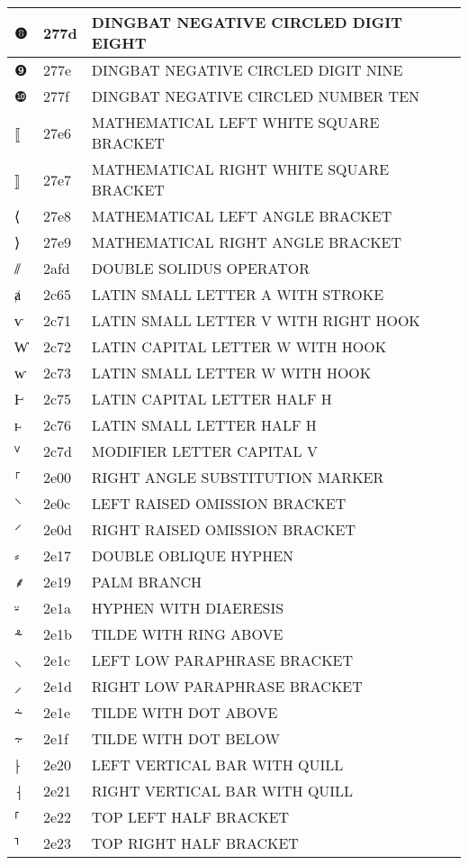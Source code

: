 \documentclass[12pt,letterpaper,openany]{book}
\begin{document}
\begin{center}
\begin{supertabular}{|m{0.25in}|m{0.5in}|m{4in}|}
❽ & 277d & DINGBAT NEGATIVE CIRCLED DIGIT EIGHT\\\hline
❾ & 277e & DINGBAT NEGATIVE CIRCLED DIGIT NINE\\\hline
❿ & 277f & DINGBAT NEGATIVE CIRCLED NUMBER TEN\\\hline
⟦ & 27e6 & MATHEMATICAL LEFT WHITE SQUARE BRACKET\\\hline
⟧ & 27e7 & MATHEMATICAL RIGHT WHITE SQUARE BRACKET\\\hline
⟨ & 27e8 & MATHEMATICAL LEFT ANGLE BRACKET\\\hline
⟩ & 27e9 & MATHEMATICAL RIGHT ANGLE BRACKET\\\hline
⫽ & 2afd & DOUBLE SOLIDUS OPERATOR\\\hline
ⱥ & 2c65 & LATIN SMALL LETTER A WITH STROKE\\\hline
ⱱ & 2c71 & LATIN SMALL LETTER V WITH RIGHT HOOK\\\hline
Ⱳ & 2c72 & LATIN CAPITAL LETTER W WITH HOOK\\\hline
ⱳ & 2c73 & LATIN SMALL LETTER W WITH HOOK\\\hline
Ⱶ & 2c75 & LATIN CAPITAL LETTER HALF H\\\hline
ⱶ & 2c76 & LATIN SMALL LETTER HALF H\\\hline
ⱽ & 2c7d & MODIFIER LETTER CAPITAL V\\\hline
⸀ & 2e00 & RIGHT ANGLE SUBSTITUTION MARKER\\\hline
⸌ & 2e0c & LEFT RAISED OMISSION BRACKET\\\hline
⸍ & 2e0d & RIGHT RAISED OMISSION BRACKET\\\hline
⸗ & 2e17 & DOUBLE OBLIQUE HYPHEN\\\hline
⸙ & 2e19 & PALM BRANCH\\\hline
⸚ & 2e1a & HYPHEN WITH DIAERESIS\\\hline
⸛ & 2e1b & TILDE WITH RING ABOVE\\\hline
⸜ & 2e1c & LEFT LOW PARAPHRASE BRACKET\\\hline
⸝ & 2e1d & RIGHT LOW PARAPHRASE BRACKET\\\hline
⸞ & 2e1e & TILDE WITH DOT ABOVE\\\hline
⸟ & 2e1f & TILDE WITH DOT BELOW\\\hline
⸠ & 2e20 & LEFT VERTICAL BAR WITH QUILL\\\hline
⸡ & 2e21 & RIGHT VERTICAL BAR WITH QUILL\\\hline
⸢ & 2e22 & TOP LEFT HALF BRACKET\\\hline
⸣ & 2e23 & TOP RIGHT HALF BRACKET\\\hline

\end{supertabular}
\end{center}
\end{document}
